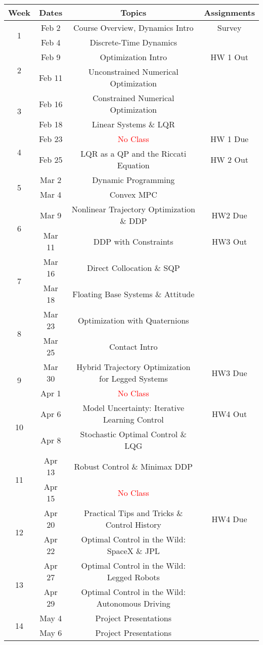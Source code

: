 \documentclass[11pt,letterpaper]{article}
\begin{document}
\begin{tabular}{c|c|c|c}
	Week & Dates & Topics & Assignments \\
	\hline
	\multirow{2}{*}{1} & Feb 2 & Course Overview, Dynamics Intro & Survey \\
	 & Feb 4 & Discrete-Time Dynamics &  \\
	\hline
	\multirow{2}{*}{2} & Feb 9 & Optimization Intro & HW 1 Out \\
	 & Feb 11 & Unconstrained Numerical Optimization &  \\
	\hline
	\multirow{2}{*}{3}  & Feb 16 & Constrained Numerical Optimization &  \\
	 & Feb 18 & Linear Systems \& LQR &  \\
	\hline
	\multirow{2}{*}{4}  & Feb 23 & \textcolor{red}{No Class} & HW 1 Due \\
	 & Feb 25 & LQR as a QP and the Riccati Equation & HW 2 Out \\
	\hline
	\multirow{2}{*}{5}  & Mar 2 & Dynamic Programming & \\
	 & Mar 4 & Convex MPC &  \\
	\hline
	\multirow{2}{*}{6}  & Mar 9 & Nonlinear Trajectory Optimization \& DDP &   HW2 Due \\
	 & Mar 11 & DDP with Constraints & HW3 Out \\
	\hline
	\multirow{2}{*}{7}  & Mar 16 & Direct Collocation \& SQP  & \\
	 & Mar 18 & Floating Base Systems \& Attitude & \\
	\hline
	\multirow{2}{*}{8}  & Mar 23 & Optimization with Quaternions & \\
	 & Mar 25 & Contact Intro & \\
	\hline
	\multirow{2}{*}{9}  & Mar 30 & Hybrid Trajectory Optimization for Legged Systems & HW3 Due \\
	 & Apr 1 & \textcolor{red}{No Class} &   \\
	\hline
	\multirow{2}{*}{10}  & Apr 6 & Model Uncertainty: Iterative Learning Control &  HW4 Out \\
	 & Apr 8 & Stochastic Optimal Control \& LQG & \\
	 \hline
	\multirow{2}{*}{11}  & Apr 13 & Robust Control \& Minimax DDP &  \\
	 & Apr 15 & \textcolor{red}{No Class} &   \\
	 \hline
	\multirow{2}{*}{12}  & Apr 20 & Practical Tips and Tricks \& Control History &  HW4 Due \\
	 & Apr 22 & Optimal Control in the Wild: SpaceX \& JPL &   \\
	 \hline
	\multirow{2}{*}{13}  & Apr 27 & Optimal Control in the Wild: Legged Robots &  \\
	 & Apr 29 & Optimal Control in the Wild: Autonomous Driving &   \\
	 \hline
	\multirow{2}{*}{14}  & May 4 & Project Presentations &  \\
	 & May 6 & Project Presentations &   \\
\end{tabular}
\end{document}
